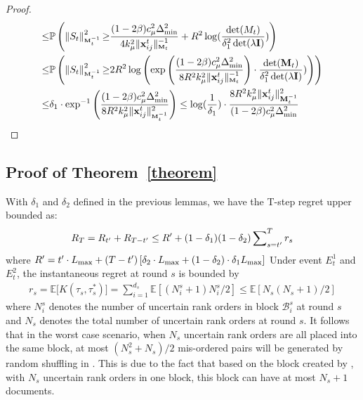 \begin{proof}
\begin{align*}
    \leq &  \mathbb{P}\left(\left\| S_t\right\|_{\scriptscriptstyle \mathbf{M}_t^{-1}}^2  {\geq}  \frac{(1 - 2\beta)c_{\mu}^2\Delta_{\min}^2}{4k_{\mu}^2\Vert{\mathbf{x}_{ij}^t}\Vert_{\scriptscriptstyle\mathbf{M}_t}^{-1}} + R^2\log(\frac{\det(M_t)}{\delta_1^2\det(\lambda\mathbf{I})})\right)\\
    \leq & \mathbb{P}\left(\left\| S_t\right\|_{\scriptscriptstyle \mathbf{M}_t^{-1}}^2  {\geq}  2R^2\log\left(\exp\left(\frac{(1 - 2\beta)c_{\mu}^2\Delta_{\min}^2}{8R^2k_{\mu}^2\Vert{\mathbf{x}_{ij}^t}\Vert_{\scriptscriptstyle \mathbf{M}_t}^{-1}}\right) \cdot \frac{\det(\mathbf{M}_t)}{\delta_1^2\det(\lambda\mathbf{I})})\right)\right) \\
    \leq & \delta_1 \cdot \exp^{-1}\left(\frac{(1 - 2\beta)c_{\mu}^2\Delta_{\min}^2}{8R^2k_{\mu}^2\Vert{\mathbf{x}_{ij}^t}\Vert_{\scriptscriptstyle \mathbf{M}_t^{-1}}^2}\right) \leq \log(\frac{1}{\delta_1}) \cdot \frac{8R^2k_{\mu}^2\Vert{\mathbf{x}_{ij}^t}\Vert_{\mathbf{M}_t^{-1}}^2}{(1 - 2\beta)c_{\mu}^2\Delta_{\min}^2}
\end{align*}
\end{proof}

\normalsize
\subsection{Proof of Theorem~\ref{theorem}}
With $\delta_1$ and $\delta_2$ defined in the previous lemmas, we have the T-step regret upper bounded as:
\small
\begin{align}
    R_T  = R_{t^\prime} + R_{T - t^\prime} \leq  R^{\prime} + (1 - \delta_1) (1 - \delta_2)\sum\nolimits_{s = t^\prime}^{T} r_s 
\label{eqn:regret_all}
 \end{align}
\normalsize
where $R^{\prime} = t^\prime \cdot L_{\max} + (T - t^\prime)\left[\delta_2 \cdot L_{\max} + (1 - \delta_2)\cdot \delta_1 L_{\max}\right]$
Under event $E_t^1$ and $E_t^2$, the instantaneous regret at round $s$ is bounded by
\small
\begin{align}
    r_s = \mathbb{E} \big[K(\tau_s, \tau_s^*)\big] = \sum\nolimits_{i=1}^{d_s}\mathbb{E}\left[{(N_i^s + 1)N_i^s}/{2}\right] \leq \mathbb{E}\left[{N_s(N_s + 1)}/{2}\right]
\label{eqn:regret_t}
\end{align}
\normalsize
where $N_i^s$ denotes the number of uncertain rank orders in block $\mathcal{B}_i^s$ at round $s$ and $N_s$ denotes the total number of uncertain rank orders at round $s$. It follows that in the worst case scenario, when $N_s$ uncertain rank orders are all placed into the same block, at most $(N_s^2 + N_s)/2$ mis-ordered pairs will be generated by random shuffling in \model{}. This is due to the fact that based on the block created by \model{}, with $N_s$ uncertain rank orders in one block, this block can have at most $N_s + 1$ documents. 

